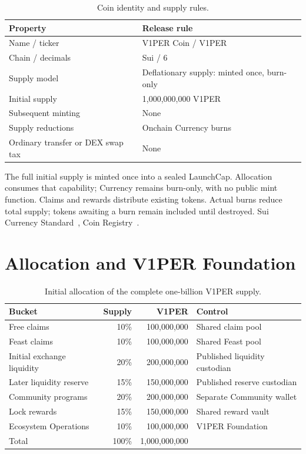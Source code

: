 \documentclass[11pt]{article}
\newcommand{\VOnePER}{\texorpdfstring{V\textcolor{brandone}{1}PER}{V1PER}}
\begin{document}
\begin{table}[H]\centering\small
\caption{Coin identity and supply rules.}
\begin{tabularx}{\textwidth}{lX}
\toprule
\textbf{Property} & \textbf{Release rule} \\
\midrule
Name / ticker & \VOnePER{} Coin / \VOnePER{} \\
Chain / decimals & Sui / 6 \\
Supply model & Deflationary supply: minted once, burn-only \\
Initial supply & 1,000,000,000 \VOnePER{} \\
Subsequent minting & None \\
Supply reductions & Onchain Currency burns \\
Ordinary transfer or DEX swap tax & None \\
\bottomrule\end{tabularx}
\end{table}

The full initial supply is minted once into a sealed LaunchCap. Allocation consumes that capability; Currency remains burn-only, with no public mint function. Claims and rewards distribute existing tokens. Actual burns reduce total supply; tokens awaiting a burn remain included until destroyed. Sui Currency Standard~\cite{ref1}, Coin Registry~\cite{ref2}.

\section{Allocation and \VOnePER{} Foundation}

\begin{table}[H]\centering\small
\caption{Initial allocation of the complete one-billion \VOnePER{} supply.}
\begin{tabularx}{\textwidth}{X r r X}
\toprule
\textbf{Bucket} & \textbf{Supply} & \textbf{\VOnePER{}} & \textbf{Control} \\
\midrule
Free claims & 10\% & 100,000,000 & Shared claim pool \\
Feast claims & 10\% & 100,000,000 & Shared Feast pool \\
Initial exchange liquidity & 20\% & 200,000,000 & Published liquidity custodian \\
Later liquidity reserve & 15\% & 150,000,000 & Published reserve custodian \\
Community programs & 20\% & 200,000,000 & Separate Community wallet \\
Lock rewards & 15\% & 150,000,000 & Shared reward vault \\
Ecosystem Operations & 10\% & 100,000,000 & \VOnePER{} Foundation \\
Total & 100\% & 1,000,000,000 &  \\
\bottomrule\end{tabularx}
\end{table}
\end{document}
